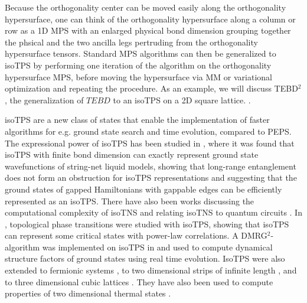 Because the orthogonality center can be moved easily along the orthogonality hypersurface, one can think of the orthogonality hypersurface along a column or row as a 1D MPS with an enlarged physical bond dimension grouping together the phsical and the two ancilla legs pertruding from the orthogonality hypersurface tensors. Standard MPS algorithms can then be generalized to isoTPS by performing one iteration of the algorithm on the orthogonality hypersurface MPS, before moving the hypersurface via MM or variational optimization and repeating the procedure. As an example, we will discuss TEBD$^2$, the generalization of $TEBD$ to an isoTPS on a 2D square lattice. . \par
isoTPS are a new class of states that enable the implementation of faster algorithms for e.g. ground state search and time evolution, compared to PEPS. The expressional power of isoTPS has been studied in \cite{cite:isometric_tensor_network_representation_of_string_net_liquids}, where it was found that isoTPS with finite bond dimension can exactly represent ground state wavefunctions of string-net liquid models, showing that long-range entanglement does not form an obstruction for isoTPS representations and suggesting that the ground states of gapped Hamiltonians with gappable edges can be efficiently represented as an isoTPS. There have also been works discussing the computational complexity of isoTNS \cite{cite:computational_complexity_of_isometric_tensor_network_states} and relating isoTNS to quantum circuits \cite{cite:sequential_generation_of_projected_entangled_pair_states, cite:quantum_circuits_for_2D_isometric_tensor_networks}. In \cite{cite:topological_quantum_phase_transitions_in_2D_isometric_tensor_networks}, topological phase transitions were studied with isoTPS, showing that isoTPS can represent some critical states with power-law correlations. A DMRG$^2$-algorithm was implemented on isoTPS in \cite{cite:efficient_simulation_of_dynamics_in_two_dimensional_quantum_spin_systems} and used to compute dynamical structure factors of ground states using real time evolution. IsoTPS were also extended to fermionic systems \cite{cite:fermionic_isometric_tensor_network_states}, to two dimensional strips of infinite length \cite{cite:two_dimensional_isometric_tensor_networks_on_infinite_strip}, and to three dimensional cubic lattices \cite{cite:three_dimensional_isometric_tensor_networks}. They have also been used to compute properties of two dimensional thermal states \cite{cite:isometric_tensor_network_representation_of_2D_thermal_states}.
